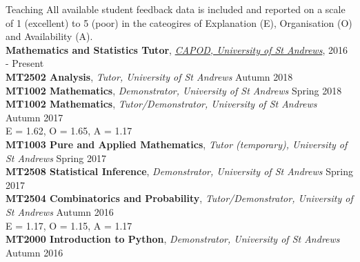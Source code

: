 \documentclass{resume} %
\begin{document}
\begin{rSection}{Teaching}
All available student feedback data is included and reported on a scale of 1 (excellent) to 5 (poor) in the cateogires of Explanation (E), Organisation (O) and Availability (A).\\

\textbf{Mathematics and Statistics Tutor}, \href{https://www.st-andrews.ac.uk/capod}{\emph{CAPOD, University of St Andrews}}, \hfill 2016 - Present\\
\textbf{MT2502 Analysis}, \emph{Tutor, University of St Andrews} \hfill Autumn 2018 \\
\textbf{MT1002 Mathematics}, \emph{Demonstrator, University of St Andrews} \hfill Spring 2018 \\
\textbf{MT1002 Mathematics}, \emph{Tutor/Demonstrator, University of St Andrews} \hfill Autumn 2017 \\
E = 1.62, O = 1.65, A = 1.17\\
\textbf{MT1003 Pure and Applied Mathematics}, \emph{Tutor (temporary), University of St Andrews} \hfill Spring 2017 \\
\textbf{MT2508 Statistical  Inference}, \emph{Demonstrator, University of St Andrews} \hfill Spring 2017 \\
\textbf{MT2504 Combinatorics and Probability}, \emph{Tutor/Demonstrator, University of St Andrews} \hfill Autumn 2016 \\
E = 1.17, O = 1.15, A = 1.17\\
\textbf{MT2000 Introduction to Python}, \emph{Demonstrator, University of St Andrews} \hfill Autumn 2016 \\
\end{rSection}
\end{document}
